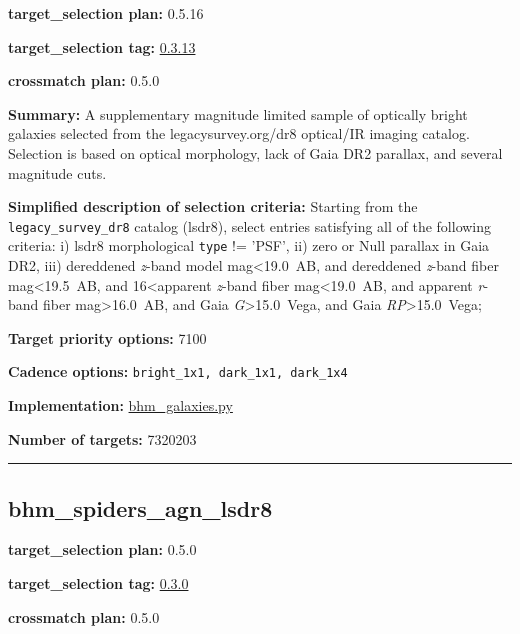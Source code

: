\noindent\textbf{target\_selection plan:} 0.5.16

\noindent\textbf{target\_selection tag:}
\href{https://github.com/sdss/target_selection/tree/0.3.13/}{0.3.13}

\noindent\textbf{crossmatch plan:} 0.5.0

\noindent\textbf{Summary:} A supplementary magnitude limited sample of optically
bright galaxies selected from the legacysurvey.org/dr8 optical/IR
imaging catalog. Selection is based on optical morphology, lack of Gaia
DR2 parallax, and several magnitude cuts.

\noindent\textbf{Simplified description of selection criteria:} Starting from the
\texttt{legacy\_survey\_dr8} catalog (lsdr8), select entries satisfying
all of the following criteria: i) lsdr8 morphological \texttt{type} !=
'PSF', ii) zero or Null parallax in Gaia DR2, iii) dereddened
\emph{z}-band model mag\textless19.0~AB, and dereddened \emph{z}-band
fiber mag\textless19.5~AB, and 16\textless apparent \emph{z}-band fiber
mag\textless19.0~AB, and apparent \emph{r}-band fiber
mag\textgreater16.0~AB, and Gaia \emph{G}\textgreater15.0~Vega, and Gaia
\emph{RP}\textgreater15.0~Vega;


\noindent\textbf{Target priority options:} 7100

\noindent\textbf{Cadence options:} \texttt{bright\_1x1,\ dark\_1x1,\ dark\_1x4}

\noindent\textbf{Implementation:}
\href{https://github.com/sdss/target_selection/blob/0.3.13/python/target_selection/cartons/bhm_galaxies.py}{bhm\_galaxies.py}

\noindent\textbf{Number of targets:} 7320203

\begin{center}\rule{0.5\linewidth}{0.5pt}\end{center}

\hypertarget{bhm_spiders_agn_lsdr8_plan0.5.0}{%
\subsection{bhm\_spiders\_agn\_lsdr8}\label{bhm_spiders_agn_lsdr8_plan0.5.0}}

\noindent\textbf{target\_selection plan:} 0.5.0

\noindent\textbf{target\_selection tag:}
\href{https://github.com/sdss/target_selection/tree/0.3.0/}{0.3.0}

\noindent\textbf{crossmatch plan:} 0.5.0

